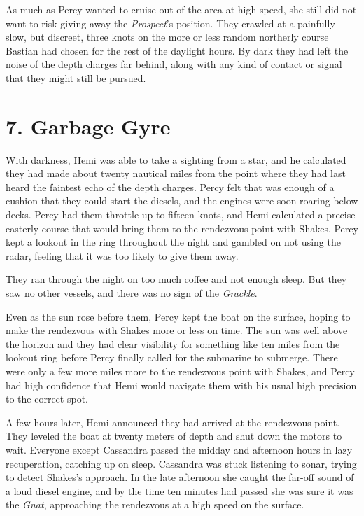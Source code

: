 \documentclass[
]{scrbook}
\begin{document}
As much as Percy wanted to cruise out of the area at high speed, she
still did not want to risk giving away the \emph{Prospect}'s position.
They crawled at a painfully slow, but discreet, three knots on the more
or less random northerly course Bastian had chosen for the rest of the
daylight hours. By dark they had left the noise of the depth charges far
behind, along with any kind of contact or signal that they might still
be pursued.

\newpage

\hypertarget{garbage-gyre}{%
\section{7. Garbage Gyre}\label{garbage-gyre}}

With darkness, Hemi was able to take a sighting from a star, and he
calculated they had made about twenty nautical miles from the point
where they had last heard the faintest echo of the depth charges. Percy
felt that was enough of a cushion that they could start the diesels, and
the engines were soon roaring below decks. Percy had them throttle up to
fifteen knots, and Hemi calculated a precise easterly course that would
bring them to the rendezvous point with Shakes. Percy kept a lookout in
the ring throughout the night and gambled on not using the radar,
feeling that it was too likely to give them away.

They ran through the night on too much coffee and not enough sleep. But
they saw no other vessels, and there was no sign of the \emph{Grackle}.

Even as the sun rose before them, Percy kept the boat on the surface,
hoping to make the rendezvous with Shakes more or less on time. The sun
was well above the horizon and they had clear visibility for something
like ten miles from the lookout ring before Percy finally called for the
submarine to submerge. There were only a few more miles more to the
rendezvous point with Shakes, and Percy had high confidence that Hemi
would navigate them with his usual high precision to the correct spot.

A few hours later, Hemi announced they had arrived at the rendezvous
point. They leveled the boat at twenty meters of depth and shut down the
motors to wait. Everyone except Cassandra passed the midday and
afternoon hours in lazy recuperation, catching up on sleep. Cassandra
was stuck listening to sonar, trying to detect Shakes's approach. In the
late afternoon she caught the far-off sound of a loud diesel engine, and
by the time ten minutes had passed she was sure it was the \emph{Gnat},
approaching the rendezvous at a high speed on the surface.
\end{document}
